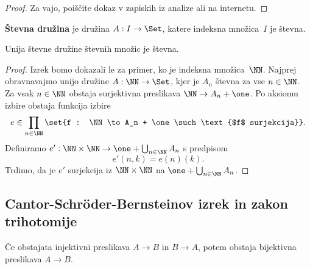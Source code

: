 \begin{proof}
  Za vajo, poiščite dokaz v zapiskih iz analize ali na internetu.
\end{proof}

\begin{definicija}
  \textbf{Števna družina} je družina $A : I \to \Set$, katere indeksna množica~$I$ je števna.
\end{definicija}

\begin{izrek}
  Unija števne družine števnih množic je števna.
\end{izrek}

\begin{proof}
  Izrek bomo dokazali le za primer, ko je indeksna množica~$\NN$.
  Najprej obravnavajmo unijo družine $A : \NN \to \Set$, kjer je $A_n$ števna za vse $n \in \NN$.
  Za vsak $n \in \NN$ obstaja surjektivna preslikava $\NN \to A_n + \one$. Po aksiomu izbire obstaja funkcija izbire
  \begin{equation*}
    e \in \prod_{n \in \NN} \set{f : \NN \to A_n + \one \such \text{$f$ surjekcija}}.
  \end{equation*}
  Definiramo $e' : \NN \times \NN \to \one + \bigcup_{n \in \NN} A_n$ s predpisom
  \begin{equation*}
    e'(n, k) = e(n)(k).
  \end{equation*}
  Trdimo, da je $e'$ surjekcija iz $\NN \times \NN$ na $\one + \bigcup_{n \in \NN} A_n$.
\end{proof}


\subsection{Cantor-Schröder-Bernsteinov izrek in zakon trihotomije}

\begin{izrek}
  Če obstajata injektivni preslikava $A \to B$ in $B \to A$, potem obstaja bijektivna preslikava $A \to B$.
\end{izrek}


